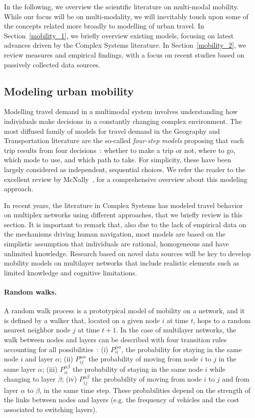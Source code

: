 In the following, we overview the scientific literature on multi-modal mobility. While our focus will be on multi-modality, we will inevitably touch upon some of the concepts related more broadly to modelling of urban travel. In Section~\ref{mobility_1}, we briefly overview existing models, focusing on latest advances driven by the Complex Systems literature. In Section~\ref{mobility_2}, we review measures and empirical findings, with a focus on recent studies based on passively collected data sources. 

\subsection{Modeling urban mobility \label{mobility_1}}
Modelling travel demand in a multimodal system involves understanding how individuals make decisions in a constantly changing complex environment. The most diffused family of models for travel demand in the Geography and Transportation literature are the so-called \emph{four-step models} proposing that each trip results from four decisions~\cite{mcnally2000four}: whether to make a trip or not, where to go, which mode to use, and which path to take. For simplicity, these have been largely considered as independent, sequential choices. We refer the reader to the excellent review by McNally~\cite{mcnally2000four}, for a comprehensive overview about this modeling approach.

In recent years, the literature in Complex Systems has modeled travel behavior on multiplex networks using different approaches, that we briefly review in this section. It is important to remark that, also due to the lack of empirical data on the mechanisms driving human navigation, most models are based on the simplistic assumption that individuals are rational, homogeneous and have unlimited knowledge. Research based on novel data sources will be key to develop mobility models on multilayer networks that include realistic elements such as limited knowledge and cognitive limitations.

\paragraph{Random walks.}
A random walk process is a prototypical model of mobility on a network, and it is defined by a walker that, located on a given node $i$ at time $t$, hops to a random nearest neighbor node $j$ at time $t + 1$. In the case of multilayer networks, the walk between nodes and layers can be described with four transition rules accounting for all possibilities~\cite{dedomenico2014interconnected}: (i) $P_{ii}^{\alpha\alpha}$, the probability for staying in the same node $i$ and layer $\alpha$; (ii) $P_{ij}^{\alpha\alpha}$ the probability of moving from node $i$ to $j$ in the same layer $\alpha$; (iii) $P_{ii}^{\alpha\beta}$ the probability of staying in the same node $i$ while changing to layer $\beta$; (iv) $P_{ij}^{\alpha\beta}$ the probability of moving from node $i$ to $j$ and from layer $\alpha$ to $\beta$, in the same time step. These probabilities depend on the strength of the links between nodes and layers (e.g. the frequency of vehicles and the cost associated to switching layers). 


